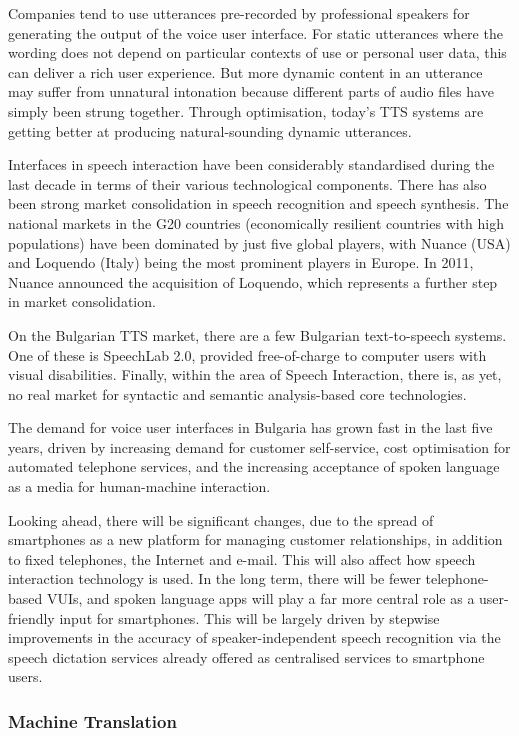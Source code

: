\documentclass[]{../../metanetpaper}
\begin{document}
\begin{multicols}{2}
Companies tend to use utterances pre-recorded by professional speakers for generating the output of the voice user interface. For static utterances where the wording does not depend on particular contexts of use or personal user data, this can deliver a rich user experience. But more dynamic content in an utterance may suffer from unnatural intonation because different parts of audio files have simply been strung together. Through optimisation, today’s TTS systems are getting better at producing natural-sounding dynamic utterances.

Interfaces in speech interaction have been considerably standardised during the last decade in terms of their various technological components. There has also been strong market consolidation in speech recognition and speech synthesis. The national markets in the G20 countries (economically resilient countries with high populations) have been dominated by just five global players, with Nuance (USA) and Loquendo (Italy) being the most prominent players in Europe. In 2011, Nuance announced the acquisition of Loquendo, which represents a further step in market consolidation.

On the Bulgarian TTS market, there are a few Bulgarian text-to-speech systems. One of these is SpeechLab 2.0, provided free-of-charge to computer users with visual disabilities. Finally, within the area of Speech Interaction, there is, as yet, no real market for syntactic and semantic analysis-based core technologies.

The demand for voice user interfaces in Bulgaria has grown fast in the last five years, driven by increasing demand for customer self-service, cost optimisation for automated telephone services, and the increasing acceptance of spoken language as a media for human-machine interaction. 

Looking ahead, there will be significant changes, due to the spread of smartphones as a new platform for managing customer relationships, in addition to fixed telephones, the Internet and e-mail. This will also affect how speech interaction technology is used. In the long term, there will be fewer telephone-based VUIs, and spoken language apps will play a far more central role as a user-friendly input for smartphones. This will be largely driven by stepwise improvements in the accuracy of speaker-independent speech recognition via the speech dictation services already offered as centralised services to smartphone users.

\subsubsection{Machine Translation}


\end{multicols}
\end{document}
